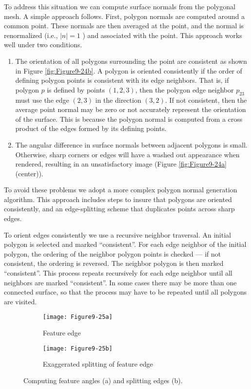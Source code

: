 To address this situation we can compute surface normals from the polygonal mesh. A simple approach follows. First, polygon normals are computed around a common point. These normals are then averaged at the point, and the normal is renormalized (i.e., $\vert n \vert = 1$ ) and associated with the point. This approach works well under two conditions.

\begin{enumerate}

\item The orientation of all polygons surrounding the point are consistent as shown in Figure \ref{fig:Figure9-24b}. A polygon is oriented consistently if the order of defining polygon points is consistent with its edge neighbors. That is, if polygon $p$ is defined by points $(1,2,3)$, then the polygon edge neighbor $p_{23}$ must use the edge $(2,3)$ in the direction $(3,2)$. If not consistent, then the average point normal may be zero or not accurately represent the orientation of the surface. This is because the polygon normal is computed from a cross product of the edges formed by its defining points.

\item The angular difference in surface normals between adjacent polygons is small. Otherwise, sharp corners or edges will have a washed out appearance when rendered, resulting in an unsatisfactory image (Figure \ref{fig:Figure9-24a}(center)).

\end{enumerate}

To avoid these problems we adopt a more complex polygon normal generation algorithm. This approach includes steps to insure that polygons are oriented consistently, and an edge-splitting scheme that duplicates points across sharp edges.

To orient edges consistently we use a recursive neighbor traversal. An initial polygon is selected and marked ``consistent''. For each edge neighbor of the initial polygon, the ordering of the neighbor polygon points is checked --- if not consistent, the ordering is reversed. The neighbor polygon is then marked ``consistent''. This process repeats recursively for each edge neighbor until all neighbors are marked ``consistent''. In some cases there may be more than one connected surface, so that the process may have to be repeated until all polygons are visited.

\begin{figure}[htb]
    \centering
	\begin{subfigure}[h]{0.48\linewidth}
		\texttt{[image: Figure9-25a]}
		\captionsetup{justification=centering}
		\caption{Feature edge}
		\label{fig:Figure9-25a}
	\end{subfigure}
	\hfill
	\begin{subfigure}[h]{0.48\linewidth}
		\texttt{[image: Figure9-25b]}
		\captionsetup{justification=centering}
		\caption{Exaggerated splitting of feature edge}
		\label{fig:Figure9-25b}
	\end{subfigure}
	\caption{Computing feature angles (a) and splitting edges (b).}\label{fig:Figure9-25}
\end{figure}

